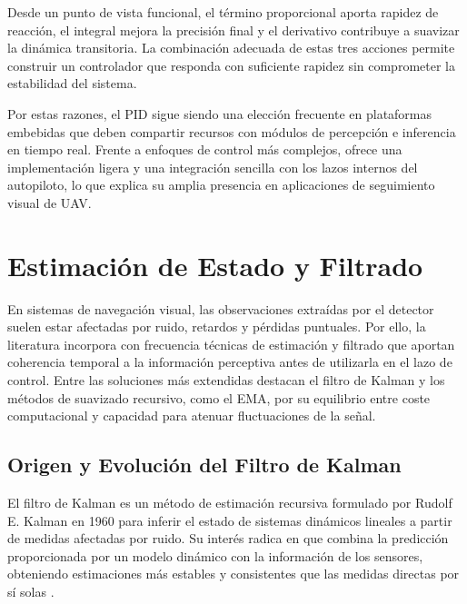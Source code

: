 \vspace{0.4cm}

Desde un punto de vista funcional, el término proporcional aporta rapidez de reacción, el integral mejora la precisión final y el derivativo contribuye a suavizar la dinámica transitoria. La combinación adecuada de estas tres acciones permite construir un controlador que responda con suficiente rapidez sin comprometer la estabilidad del sistema.

\vspace{0.4cm}

Por estas razones, el PID sigue siendo una elección frecuente en plataformas embebidas que deben compartir recursos con módulos de percepción e inferencia en tiempo real. Frente a enfoques de control más complejos, ofrece una implementación ligera y una integración sencilla con los lazos internos del autopiloto, lo que explica su amplia presencia en aplicaciones de seguimiento visual de UAV.

\vspace{0.4cm}


\section{Estimación de Estado y Filtrado}

En sistemas de navegación visual, las observaciones extraídas por el detector suelen estar afectadas por ruido, retardos y pérdidas puntuales. Por ello, la literatura incorpora con frecuencia técnicas de estimación y filtrado que aportan coherencia temporal a la información perceptiva antes de utilizarla en el lazo de control. Entre las soluciones más extendidas destacan el filtro de Kalman y los métodos de suavizado recursivo, como el EMA, por su equilibrio entre coste computacional y capacidad para atenuar fluctuaciones de la señal.

\vspace{0.4cm}

\subsection{Origen y Evolución del Filtro de Kalman}

El filtro de Kalman es un método de estimación recursiva formulado por Rudolf E. Kalman en 1960 para inferir el estado de sistemas dinámicos lineales a partir de medidas afectadas por ruido. Su interés radica en que combina la predicción proporcionada por un modelo dinámico con la información de los sensores, obteniendo estimaciones más estables y consistentes que las medidas directas por sí solas \cite{kalman1960new, kalmanfilterNetES, wikipediaFiltroKalman}.

